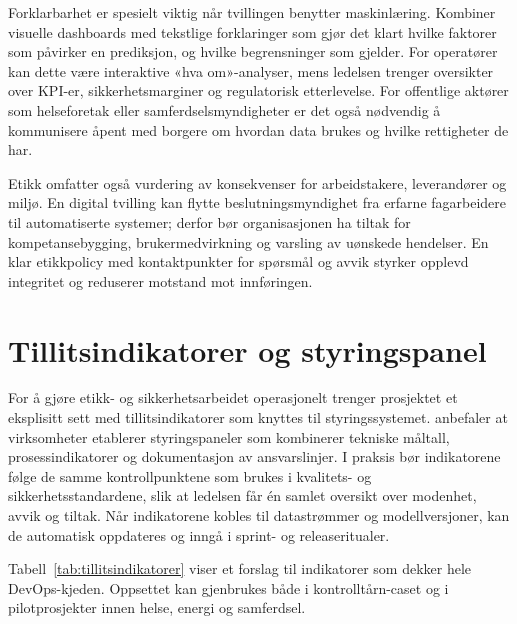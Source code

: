 Forklarbarhet er spesielt viktig når tvillingen benytter maskinlæring. Kombiner visuelle dashboards med tekstlige forklaringer som gjør det klart hvilke faktorer som påvirker en prediksjon, og hvilke begrensninger som gjelder. For operatører kan dette være interaktive «hva om»-analyser, mens ledelsen trenger oversikter over KPI-er, sikkerhetsmarginer og regulatorisk etterlevelse. For offentlige aktører som helseforetak eller samferdselsmyndigheter er det også nødvendig å kommunisere åpent med borgere om hvordan data brukes og hvilke rettigheter de har.

Etikk omfatter også vurdering av konsekvenser for arbeidstakere, leverandører og miljø. En digital tvilling kan flytte beslutningsmyndighet fra erfarne fagarbeidere til automatiserte systemer; derfor bør organisasjonen ha tiltak for kompetansebygging, brukermedvirkning og varsling av uønskede hendelser. En klar etikkpolicy med kontaktpunkter for spørsmål og avvik styrker opplevd integritet og reduserer motstand mot innføringen.

\section{Tillitsindikatorer og styringspanel}
For å gjøre etikk- og sikkerhetsarbeidet operasjonelt trenger prosjektet et eksplisitt sett med tillitsindikatorer som knyttes til styringssystemet. \citet{digdir2023styringai} anbefaler at virksomheter etablerer styringspaneler som kombinerer tekniske måltall, prosessindikatorer og dokumentasjon av ansvarslinjer. I praksis bør indikatorene følge de samme kontrollpunktene som brukes i kvalitets- og sikkerhetsstandardene, slik at ledelsen får én samlet oversikt over modenhet, avvik og tiltak. Når indikatorene kobles til datastrømmer og modellversjoner, kan de automatisk oppdateres og inngå i sprint- og releaseritualer.

Tabell~\ref{tab:tillitsindikatorer} viser et forslag til indikatorer som dekker hele DevOps-kjeden. Oppsettet kan gjenbrukes både i kontrolltårn-caset og i pilotprosjekter innen helse, energi og samferdsel.

